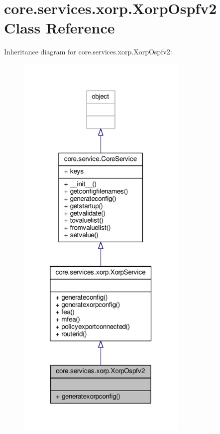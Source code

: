 \hypertarget{classcore_1_1services_1_1xorp_1_1_xorp_ospfv2}{\section{core.\+services.\+xorp.\+Xorp\+Ospfv2 Class Reference}
\label{classcore_1_1services_1_1xorp_1_1_xorp_ospfv2}
}


Inheritance diagram for core.\+services.\+xorp.\+Xorp\+Ospfv2\+:
\nopagebreak
\begin{figure}[H]
\begin{center}
\leavevmode
\includegraphics[height=550pt]{classcore_1_1services_1_1xorp_1_1_xorp_ospfv2__inherit__graph}
\end{center}
\end{figure}


